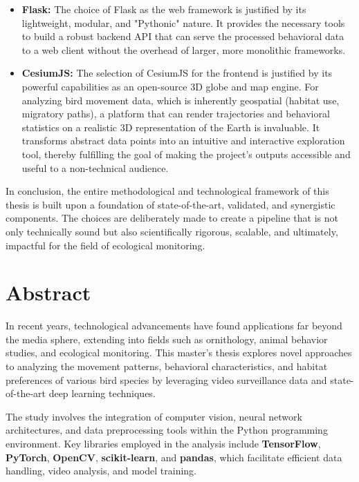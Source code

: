 \begin{itemize}
    \item \textbf{Flask:} The choice of Flask as the web framework is justified by its lightweight, modular, and "Pythonic" nature. It provides the necessary tools to build a robust backend API that can serve the processed behavioral data to a web client without the overhead of larger, more monolithic frameworks.

    \item \textbf{CesiumJS:} The selection of CesiumJS for the frontend is justified by its powerful capabilities as an open-source 3D globe and map engine. For analyzing bird movement data, which is inherently geospatial (habitat use, migratory paths), a platform that can render trajectories and behavioral statistics on a realistic 3D representation of the Earth is invaluable. It transforms abstract data points into an intuitive and interactive exploration tool, thereby fulfilling the goal of making the project's outputs accessible and useful to a non-technical audience.
\end{itemize}
In conclusion, the entire methodological and technological framework of this thesis is built upon a foundation of state-of-the-art, validated, and synergistic components. The choices are deliberately made to create a pipeline that is not only technically sound but also scientifically rigorous, scalable, and ultimately, impactful for the field of ecological monitoring.

\cleardoublepage %

\chapter*{Abstract}
\thispagestyle{empty}

In recent years, technological advancements have found applications far beyond the media sphere, extending into fields such as ornithology, animal behavior studies, and ecological monitoring. This master's thesis explores novel approaches to analyzing the movement patterns, behavioral characteristics, and habitat preferences of various bird species by leveraging video surveillance data and state-of-the-art deep learning techniques.

The study involves the integration of computer vision, neural network architectures, and data preprocessing tools within the Python programming environment. Key libraries employed in the analysis include \textbf{TensorFlow}, \textbf{PyTorch}, \textbf{OpenCV}, \textbf{scikit-learn}, and \textbf{pandas}, which facilitate efficient data handling, video analysis, and model training.

